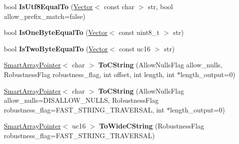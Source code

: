 \begin{DoxyCompactItemize}
\item 
\hypertarget{classv8_1_1internal_1_1_string_a736e8ab51faf13de279e4a9905f06a9b}{}bool {\bfseries Is\+Utf8\+Equal\+To} (\hyperlink{classv8_1_1internal_1_1_vector}{Vector}$<$ const char $>$ str, bool allow\+\_\+prefix\+\_\+match=false)\label{classv8_1_1internal_1_1_string_a736e8ab51faf13de279e4a9905f06a9b}

\item 
\hypertarget{classv8_1_1internal_1_1_string_a389361bf57fdc47c2955e0f36affd458}{}bool {\bfseries Is\+One\+Byte\+Equal\+To} (\hyperlink{classv8_1_1internal_1_1_vector}{Vector}$<$ const uint8\+\_\+t $>$ str)\label{classv8_1_1internal_1_1_string_a389361bf57fdc47c2955e0f36affd458}

\item 
\hypertarget{classv8_1_1internal_1_1_string_a92b45dd0f7a9ab49cc053cf0e913e108}{}bool {\bfseries Is\+Two\+Byte\+Equal\+To} (\hyperlink{classv8_1_1internal_1_1_vector}{Vector}$<$ const uc16 $>$ str)\label{classv8_1_1internal_1_1_string_a92b45dd0f7a9ab49cc053cf0e913e108}

\item 
\hypertarget{classv8_1_1internal_1_1_string_abaa4aca69850859dd89aab09402c46ea}{}\hyperlink{classv8_1_1internal_1_1_smart_array_pointer}{Smart\+Array\+Pointer}$<$ char $>$ {\bfseries To\+C\+String} (Allow\+Nulls\+Flag allow\+\_\+nulls, Robustness\+Flag robustness\+\_\+flag, int offset, int length, int $\ast$length\+\_\+output=0)\label{classv8_1_1internal_1_1_string_abaa4aca69850859dd89aab09402c46ea}

\item 
\hypertarget{classv8_1_1internal_1_1_string_a8c1d2fdb14b3ef0cf0623668792fdf85}{}\hyperlink{classv8_1_1internal_1_1_smart_array_pointer}{Smart\+Array\+Pointer}$<$ char $>$ {\bfseries To\+C\+String} (Allow\+Nulls\+Flag allow\+\_\+nulls=D\+I\+S\+A\+L\+L\+O\+W\+\_\+\+N\+U\+L\+L\+S, Robustness\+Flag robustness\+\_\+flag=F\+A\+S\+T\+\_\+\+S\+T\+R\+I\+N\+G\+\_\+\+T\+R\+A\+V\+E\+R\+S\+A\+L, int $\ast$length\+\_\+output=0)\label{classv8_1_1internal_1_1_string_a8c1d2fdb14b3ef0cf0623668792fdf85}

\item 
\hypertarget{classv8_1_1internal_1_1_string_a4be71743d6c7de2abaca86920f254db9}{}\hyperlink{classv8_1_1internal_1_1_smart_array_pointer}{Smart\+Array\+Pointer}$<$ uc16 $>$ {\bfseries To\+Wide\+C\+String} (Robustness\+Flag robustness\+\_\+flag=F\+A\+S\+T\+\_\+\+S\+T\+R\+I\+N\+G\+\_\+\+T\+R\+A\+V\+E\+R\+S\+A\+L)\label{classv8_1_1internal_1_1_string_a4be71743d6c7de2abaca86920f254db9}


\end{DoxyCompactItemize}
